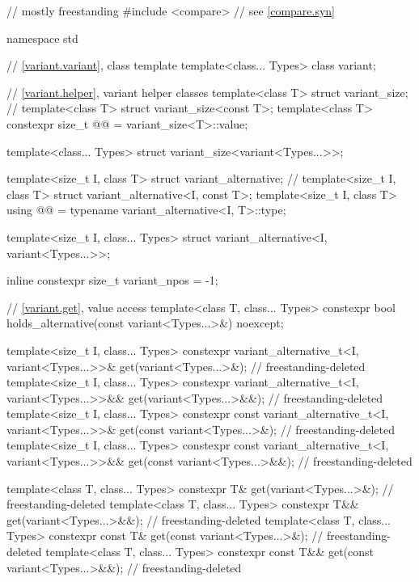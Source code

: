 \begin{codeblock}
// mostly freestanding
#include <compare>              // see \ref{compare.syn}

namespace std {
  // \ref{variant.variant}, class template 
  template<class... Types>
    class variant;

  // \ref{variant.helper}, variant helper classes
  template<class T> struct variant_size;                        // \notdef
  template<class T> struct variant_size<const T>;
  template<class T>
    constexpr size_t @@ = variant_size<T>::value;

  template<class... Types>
    struct variant_size<variant<Types...>>;

  template<size_t I, class T> struct variant_alternative;       // \notdef
  template<size_t I, class T> struct variant_alternative<I, const T>;
  template<size_t I, class T>
    using @@ = typename variant_alternative<I, T>::type;

  template<size_t I, class... Types>
    struct variant_alternative<I, variant<Types...>>;

  inline constexpr size_t variant_npos = -1;

  // \ref{variant.get}, value access
  template<class T, class... Types>
    constexpr bool holds_alternative(const variant<Types...>&) noexcept;

  template<size_t I, class... Types>
    constexpr variant_alternative_t<I, variant<Types...>>&
      get(variant<Types...>&);                                          // freestanding-deleted
  template<size_t I, class... Types>
    constexpr variant_alternative_t<I, variant<Types...>>&&
      get(variant<Types...>&&);                                         // freestanding-deleted
  template<size_t I, class... Types>
    constexpr const variant_alternative_t<I, variant<Types...>>&
      get(const variant<Types...>&);                                    // freestanding-deleted
  template<size_t I, class... Types>
    constexpr const variant_alternative_t<I, variant<Types...>>&&
      get(const variant<Types...>&&);                                   // freestanding-deleted

  template<class T, class... Types>
    constexpr T& get(variant<Types...>&);                               // freestanding-deleted
  template<class T, class... Types>
    constexpr T&& get(variant<Types...>&&);                             // freestanding-deleted
  template<class T, class... Types>
    constexpr const T& get(const variant<Types...>&);                   // freestanding-deleted
  template<class T, class... Types>
    constexpr const T&& get(const variant<Types...>&&);                 // freestanding-deleted

}
\end{codeblock}
